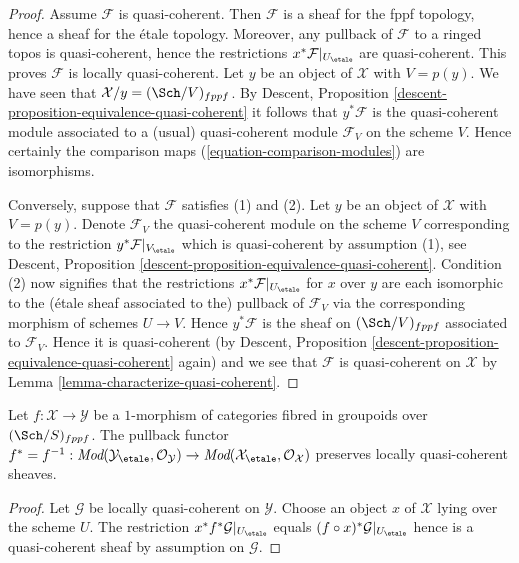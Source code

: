 \begin{proof}
Assume $\mathcal{F}$ is quasi-coherent. Then $\mathcal{F}$ is a sheaf
for the fppf topology, hence a sheaf for the \'etale topology. Moreover,
any pullback of $\mathcal{F}$ to a ringed topos is quasi-coherent, hence
the restrictions $x^*\mathcal{F}|_{U_\etale}$ are quasi-coherent.
This proves $\mathcal{F}$ is locally quasi-coherent.
Let $y$ be an object of $\mathcal{X}$ with $V = p(y)$.
We have seen that $\mathcal{X}/y = (\Sch/V)_{fppf}$. By
Descent, Proposition \ref{descent-proposition-equivalence-quasi-coherent}
it follows that $y^*\mathcal{F}$ is the quasi-coherent module
associated to a (usual) quasi-coherent module $\mathcal{F}_V$ on
the scheme $V$. Hence certainly the comparison maps
(\ref{equation-comparison-modules}) are isomorphisms.

\medskip\noindent
Conversely, suppose that $\mathcal{F}$ satisfies (1) and (2).
Let $y$ be an object of $\mathcal{X}$ with $V = p(y)$. Denote
$\mathcal{F}_V$ the quasi-coherent module on
the scheme $V$ corresponding to the restriction
$y^*\mathcal{F}|_{V_\etale}$ which is quasi-coherent by
assumption (1), see
Descent, Proposition \ref{descent-proposition-equivalence-quasi-coherent}.
Condition (2) now signifies that the restrictions
$x^*\mathcal{F}|_{U_\etale}$ for $x$ over $y$ are each
isomorphic to the (\'etale sheaf associated to the) pullback of $\mathcal{F}_V$
via the corresponding morphism of schemes $U \to V$.
Hence $y^*\mathcal{F}$ is the sheaf on $(\Sch/V)_{fppf}$
associated to $\mathcal{F}_V$. Hence it is quasi-coherent (by
Descent, Proposition \ref{descent-proposition-equivalence-quasi-coherent}
again) and we see that $\mathcal{F}$ is quasi-coherent on $\mathcal{X}$ by
Lemma \ref{lemma-characterize-quasi-coherent}.
\end{proof}

\begin{lemma}
\label{lemma-pullback-lqc}
Let $f : \mathcal{X} \to \mathcal{Y}$ be a $1$-morphism of categories
fibred in groupoids over $(\Sch/S)_{fppf}$. The pullback functor
$f^* = f^{-1} :
\textit{Mod}(\mathcal{Y}_\etale, \mathcal{O}_\mathcal{Y})
\to
\textit{Mod}(\mathcal{X}_\etale, \mathcal{O}_\mathcal{X})$
preserves locally quasi-coherent sheaves.
\end{lemma}

\begin{proof}
Let $\mathcal{G}$ be locally quasi-coherent on $\mathcal{Y}$.
Choose an object $x$ of $\mathcal{X}$ lying over the scheme $U$.
The restriction $x^*f^*\mathcal{G}|_{U_\etale}$ equals
$(f \circ x)^*\mathcal{G}|_{U_\etale}$
hence is a quasi-coherent sheaf by assumption on $\mathcal{G}$.
\end{proof}

